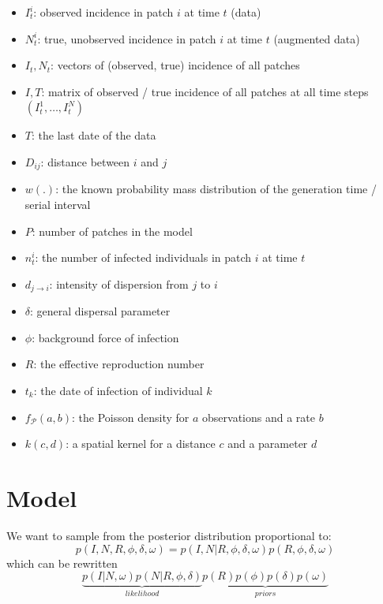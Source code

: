 \documentclass[a4paper,11pt]{article}
\begin{document}
\begin{itemize}
 \item $I_t^i$: observed incidence in patch $i$ at time $t$ (data)
 \item $N_t^i$: true, unobserved incidence in patch $i$ at time $t$ (augmented data)
 \item $I_t, N_t$: vectors of (observed, true) incidence of all patches
 \item $I,T$: matrix of observed / true incidence of all patches at all time steps $(I_t^1, \ldots, I_t^N)$
 \item $T$: the last date of the data
 \item $D_{ij}$: distance between $i$ and $j$
 \item $w(.)$: the known probability mass distribution of the generation time / serial interval
 \item $P$: number of patches in the model
 \item $n_t^i$: the number of infected individuals in patch $i$ at time $t$
 \item $d_{j\rightarrow i}$: intensity of dispersion from $j$ to $i$
 \item $\delta$: general dispersal parameter
 \item $\phi$: background force of infection
 \item $R$: the effective reproduction number
 \item $t_k$: the date of infection of individual $k$
 \item $f_\mathcal{P}(a,b)$: the Poisson density for $a$ observations and a rate $b$
 \item $k(c,d)$: a spatial kernel for a distance $c$ and a parameter $d$
\end{itemize}





\section{Model}

We want to sample from the posterior distribution proportional to:
\begin{equation}
 p(I, N, R, \phi, \delta, \omega) = p(I, N | R, \phi, \delta, \omega) p(R, \phi, \delta, \omega)
\end{equation}
which can be rewritten
\begin{equation}
\underbrace{p(I | N, \omega) p(N | R, \phi, \delta)}_{likelihood} 
\underbrace{ p(R) p(\phi) p(\delta) p(\omega)}_{priors} 
\end{equation}
\end{document}

